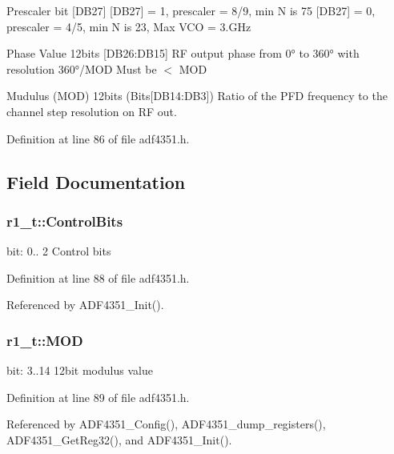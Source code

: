 Prescaler bit \mbox{[}D\+B27\mbox{]} \mbox{[}D\+B27\mbox{]} = 1, prescaler = 8/9, min N is 75 \mbox{[}D\+B27\mbox{]} = 0, prescaler = 4/5, min N is 23, Max V\+CO = 3.\+G\+Hz

Phase Value 12bits \mbox{[}D\+B26\+:D\+B15\mbox{]} RF output phase from 0° to 360° with resolution 360°/\+M\+OD Must be $<$ M\+OD

Mudulus (M\+OD) 12bits (Bits\mbox{[}D\+B14\+:D\+B3\mbox{]}) Ratio of the P\+FD frequency to the channel step resolution on RF out. 

Definition at line 86 of file adf4351.\+h.



\subsection{Field Documentation}
\subsubsection[{\texorpdfstring{Control\+Bits}{ControlBits}}]{ r1\+\_\+t\+::\+Control\+Bits}\hypertarget{structr1__t_a5335bbd53d06ad7afb879d919033404c}{}\label{structr1__t_a5335bbd53d06ad7afb879d919033404c}
bit\+: 0.. 2 Control bits 

Definition at line 88 of file adf4351.\+h.



Referenced by A\+D\+F4351\+\_\+\+Init().

\subsubsection[{\texorpdfstring{M\+OD}{MOD}}]{ r1\+\_\+t\+::\+M\+OD}\hypertarget{structr1__t_a9ea14fcf64bbacfbcfa5afa992c0b87d}{}\label{structr1__t_a9ea14fcf64bbacfbcfa5afa992c0b87d}
bit\+: 3..14 12bit modulus value 

Definition at line 89 of file adf4351.\+h.



Referenced by A\+D\+F4351\+\_\+\+Config(), A\+D\+F4351\+\_\+dump\+\_\+registers(), A\+D\+F4351\+\_\+\+Get\+Reg32(), and A\+D\+F4351\+\_\+\+Init().

